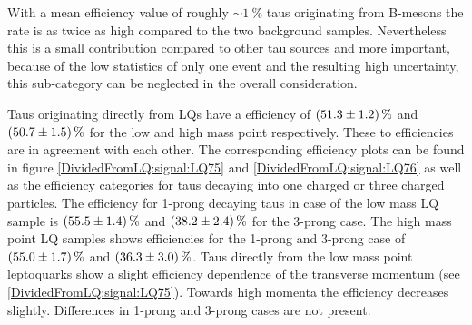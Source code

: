 %
With a mean efficiency value of roughly $\sim\SI{1}{\percent}$ taus originating from B-mesons the rate is as twice as high compared to the two background samples. Nevertheless this is a small contribution compared to other tau sources and more important, because of the low statistics of only one event and the resulting high uncertainty, this sub-category can be neglected in the overall consideration.\par  
%
Taus originating directly from LQs have a efficiency of $\SI{51.3\pm 1.2}{\percent}$ and $\SI{50.7\pm 1.5}{\percent}$ for the low and high mass point respectively. These to efficiencies are in agreement with each other. The corresponding efficiency plots can be found in figure \ref{DividedFromLQ:signal:LQ75} and \ref{DividedFromLQ:signal:LQ76} as well as the efficiency categories for taus decaying into one charged or three charged particles. The efficiency for 1-prong decaying taus in case of the low mass LQ sample is $\SI{55.5\pm 1.4}{\percent}$ and $\SI{38.2\pm 2.4}{\percent}$ for the 3-prong case. The high mass point LQ samples shows efficiencies for the 1-prong and 3-prong case of $\SI{55.0\pm 1.7}{\percent}$ and $\SI{36.3\pm 3.0}{\percent}$. Taus directly from the low mass point leptoquarks show a slight efficiency dependence of the transverse momentum (see \ref{DividedFromLQ:signal:LQ75}). Towards high momenta the efficiency decreases slightly. Differences in 1-prong and 3-prong cases are not present.\par
